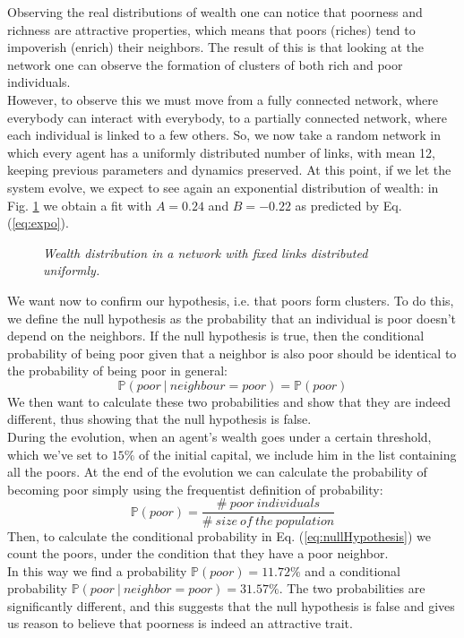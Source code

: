 Observing the real distributions of wealth one can notice that poorness and richness are attractive properties, which means that poors (riches) tend to impoverish (enrich) their neighbors.
The result of this is that looking at the network one can observe the formation of clusters of both rich and poor individuals. \\
However, to observe this we must move from a fully connected network, where everybody can interact with everybody, to a partially connected network, where each individual is linked to a few others.
So, we now take a random network in which every agent has a uniformly distributed number of links, with mean 12, keeping previous parameters and dynamics preserved.
At this point, if we let the system evolve, we expect to see again an exponential distribution of wealth: in Fig. \ref{fig:fixedExpo} we obtain a fit with $A = 0.24$ and $B = -0.22$ as predicted by Eq. (\ref{eq:expo}).
\begin{figure}[ht!]
    \centering
    \scalebox{.7}{}
    \caption{\emph{Wealth distribution in a network with fixed links distributed uniformly.}}
    \label{fig:fixedExpo}
\end{figure}
We want now to confirm our hypothesis, i.e. that poors form clusters.
To do this, we define the null hypothesis as the probability that an individual is poor doesn't depend on the neighbors.
If the null hypothesis is true, then the conditional probability of being poor given that a neighbor is also poor should be identical to the probability of being poor in general:
\begin{equation}
    \mathbb{P}(poor \ | \ neighbour=poor) = \mathbb{P}(poor)
	\label{eq:nullHypothesis}
\end{equation}
We then want to calculate these two probabilities and show that they are indeed different, thus showing that the null hypothesis is false. \\
During the evolution, when an agent's wealth goes under a certain threshold, which we've set to $15 \%$ of the initial capital, we include him in the list containing all the poors.
At the end of the evolution we can calculate the probability of becoming poor simply using the frequentist definition of probability:
$$
	\mathbb{P}(poor) = \frac{\# \ poor \ individuals}{\# \ size \ of \ the \ population}
$$
Then, to calculate the conditional probability in Eq. (\ref{eq:nullHypothesis}) we count the poors, under the condition that they have a poor neighbor. \\
In this way we find a probability $\mathbb{P}(poor) = 11.72 \%$ and a conditional probability $\mathbb{P}(poor \ | \ neighbor=poor) = 31.57 \%$.
The two probabilities are significantly different, and this suggests that the null hypothesis is false and gives us reason to believe that poorness is indeed an attractive trait.
